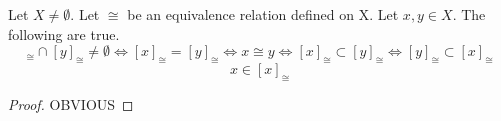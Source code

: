 \begin{prop}
    \label{prop:EquivalenceClassesPartition}
    
    Let $X \neq \emptyset$. 
    Let $\cong$ be an equivalence relation defined on X. 
    Let $x,y \in X$. 
    The following are true.
    \begin{equation}
        [x]_{\cong}  \cap [y]_{\cong} \neq \emptyset \iff [x]_{\cong} = [y]_{\cong}  \iff x \cong y \iff [x]_{\cong} \subset [y]_{\cong} \iff [y]_{\cong} \subset [x]_{\cong} 
    \end{equation}
    \begin{equation}
        x \in [x]_{\cong} 
    \end{equation}
    \begin{proof} OBVIOUS \end{proof}
\end{prop} 